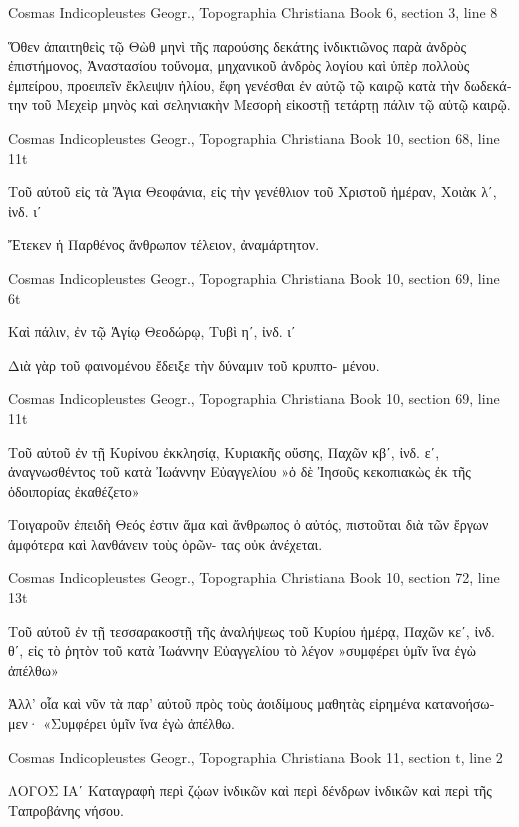 \documentclass[12pt,letterpaper,twoside,final]{memoir}
\begin{document}
\begin{greek}
Cosmas Indicopleustes Geogr., Topographia Christiana 
Book 6, section 3, line 8

                                           Ὅθεν ἀπαιτηθεὶς τῷ 
Θὼθ μηνὶ τῆς παρούσης δεκάτης ἰνδικτιῶνος παρὰ ἀνδρὸς 
ἐπιστήμονος, Ἀναστασίου τοὔνομα, μηχανικοῦ ἀνδρὸς λογίου 
καὶ ὑπὲρ πολλοὺς ἐμπείρου, προειπεῖν ἔκλειψιν ἡλίου, ἔφη   
γενέσθαι ἐν αὐτῷ τῷ καιρῷ κατὰ τὴν δωδεκάτην τοῦ Μεχεὶρ 
μηνὸς καὶ σεληνιακὴν Μεσορὴ εἰκοστῇ τετάρτῃ πάλιν τῷ αὐτῷ 
καιρῷ. 



Cosmas Indicopleustes Geogr., Topographia Christiana 
Book 10, section 68, line 11t

Τοῦ αὐτοῦ 
εἰς τὰ Ἅγια Θεοφάνια, 
εἰς τὴν γενέθλιον τοῦ Χριστοῦ ἡμέραν, 
Χοιὰκ λʹ, ἰνδ. ιʹ


 Ἔτεκεν ἡ Παρθένος ἄνθρωπον τέλειον, ἀναμάρτητον. 



Cosmas Indicopleustes Geogr., Topographia Christiana 
Book 10, section 69, line 6t

Καὶ πάλιν, 
ἐν τῷ Ἁγίῳ Θεοδώρῳ, 
Τυβὶ ηʹ, ἰνδ. ιʹ


 Διὰ γὰρ τοῦ φαινομένου ἔδειξε τὴν δύναμιν τοῦ κρυπτο-
μένου. 



Cosmas Indicopleustes Geogr., Topographia Christiana 
Book 10, section 69, line 11t

Τοῦ αὐτοῦ 
ἐν τῇ Κυρίνου ἐκκλησίᾳ, Κυριακῆς οὔσης, 
Παχῶν κβʹ, ἰνδ. εʹ, 
ἀναγνωσθέντος τοῦ κατὰ Ἰωάννην Εὐαγγελίου 
»ὁ δὲ Ἰησοῦς κεκοπιακὼς ἐκ τῆς ὁδοιπορίας ἐκαθέζετο»


 Τοιγαροῦν ἐπειδὴ Θεός ἐστιν ἅμα καὶ ἄνθρωπος ὁ αὐτός, 
πιστοῦται διὰ τῶν ἔργων ἀμφότερα καὶ λανθάνειν τοὺς ὁρῶν-
τας οὐκ ἀνέχεται. 



Cosmas Indicopleustes Geogr., Topographia Christiana 
Book 10, section 72, line 13t

Τοῦ αὐτοῦ 
ἐν τῇ τεσσαρακοστῇ τῆς ἀναλήψεως τοῦ Κυρίου ἡμέρᾳ, 
Παχῶν κεʹ, ἰνδ. θʹ, 
εἰς τὸ ῥητὸν τοῦ κατὰ Ἰωάννην Εὐαγγελίου τὸ λέγον 
»συμφέρει ὑμῖν ἵνα ἐγὼ ἀπέλθω»


 Ἀλλ' οἷα καὶ νῦν τὰ παρ' αὐτοῦ πρὸς τοὺς ἀοιδίμους 
μαθητὰς εἰρημένα κατανοήσωμεν· «Συμφέρει ὑμῖν ἵνα ἐγὼ   
ἀπέλθω. 



Cosmas Indicopleustes Geogr., Topographia Christiana 
Book 11, section t, line 2

ΛΟΓΟΣ ΙΑʹ 
 Καταγραφὴ περὶ ζῴων ἰνδικῶν καὶ περὶ δένδρων ἰνδικῶν 
καὶ περὶ τῆς Ταπροβάνης νήσου. 





\end{greek}
\end{document}

